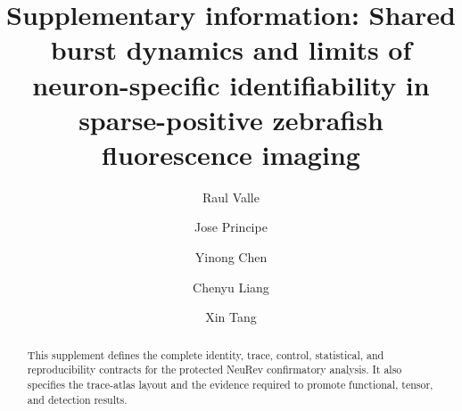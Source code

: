 \documentclass[preprint,12pt,authoryear]{elsarticle}
\begin{document}
\begin{frontmatter}
\title{Supplementary information: Shared burst dynamics and limits of neuron-specific identifiability in sparse-positive zebrafish fluorescence imaging}
\author[uf]{Raul Valle}
\author[affpending]{Jose Principe}
\author[affpending]{Yinong Chen}
\author[affpending]{Chenyu Liang}
\author[affpending]{Xin Tang}
\begin{abstract}
This supplement defines the complete identity, trace, control, statistical, and reproducibility contracts for the protected NeuRev confirmatory analysis. It also specifies the trace-atlas layout and the evidence required to promote functional, tensor, and detection results.
\end{abstract}
\end{frontmatter}

\DraftBanner
\renewcommand{\thesection}{S\arabic{section}}
\renewcommand{\thetable}{S\arabic{table}}
\renewcommand{\thefigure}{S\arabic{figure}}
\renewcommand{\theequation}{S\arabic{equation}}




\end{document}

